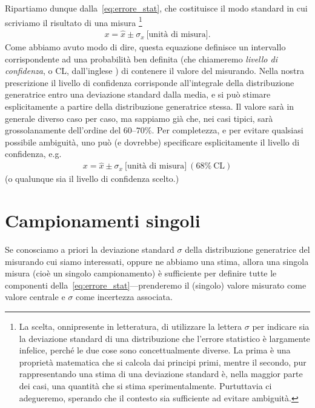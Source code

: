 Ripartiamo dunque dalla~\eqref{eq:errore_stat}, che costituisce il modo standard
in cui scriviamo il risultato di una misura%
\footnote{La scelta, onnipresente in letteratura, di utilizzare la lettera
  $\sigma$ per indicare sia la deviazione standard di una distribuzione che
  l'errore statistico è largamente infelice, perché le due cose sono
  concettualmente diverse. La prima è una proprietà matematica che si
  calcola dai principi primi, mentre il secondo, pur rappresentando una stima
  di una deviazione standard è, nella maggior parte dei casi, una quantità
  che si stima sperimentalmente. Purtuttavia ci adegueremo, sperando che il
  contesto sia sufficiente ad evitare ambiguità.}
\begin{align*}
  x = \hat{x} \pm \sigma_x~\text{[unità di misura]}.
\end{align*}
Come abbiamo avuto modo di dire, questa equazione definisce un intervallo
corrispondente ad una probabilità ben definita (che chiameremo
\emph{livello di confidenza}, o CL, dall'inglese )
di contenere il valore del misurando.
Nella nostra prescrizione il livello di confidenza corrisponde all'integrale
della distribuzione generatrice entro una deviazione standard dalla media, e si
può stimare esplicitamente a partire della distribuzione generatrice stessa.
Il valore sarà in generale diverso caso per caso, ma sappiamo già che, nei
casi tipici, sarà grossolanamente dell'ordine del $60$--$70\%$.
Per completezza, e per evitare qualsiasi possibile ambiguità, uno può
(e dovrebbe) specificare esplicitamente il livello di confidenza, e.g.
\begin{align}\label{eq:errore_stat_cl}
  x = \hat{x} \pm \sigma_x~\text{[unità di misura]}~(68\%~\text{CL})
\end{align}
(o qualunque sia il livello di confidenza scelto.)


\section{Campionamenti singoli}
\label{sec:errore_campionamenti_singoli}

Se conosciamo a priori la deviazione standard $\sigma$ della distribuzione
generatrice del misurando cui siamo interessati, oppure ne abbiamo una stima,
allora una singola misura (cioè un singolo campionamento) è sufficiente per
definire tutte le componenti della~\eqref{eq:errore_stat}---prenderemo il (singolo)
valore misurato come valore centrale e $\sigma$ come incertezza associata.

